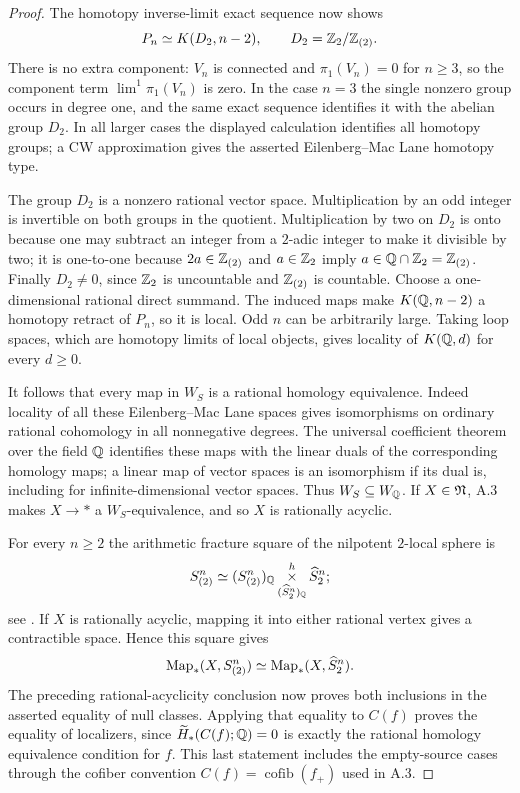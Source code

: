 \begin{proof}
The homotopy inverse-limit exact sequence now shows
\[
 P_n\simeq K(D_2,n-2),\qquad D_2=\mathbb Z_2/\mathbb Z_{(2)}.
\]
There is no extra component: $V_n$ is connected and $\pi_1(V_n)=0$ for $n\geq3$, so the component term $\lim^1\pi_1(V_n)$ is zero. In the case $n=3$ the single nonzero group occurs in degree one, and the same exact sequence identifies it with the abelian group $D_2$. In all larger cases the displayed calculation identifies all homotopy groups; a CW approximation gives the asserted Eilenberg--Mac Lane homotopy type.

The group $D_2$ is a nonzero rational vector space. Multiplication by an odd integer is invertible on both groups in the quotient. Multiplication by two on $D_2$ is onto because one may subtract an integer from a $2$-adic integer to make it divisible by two; it is one-to-one because $2a\in\mathbb Z_{(2)}$ and $a\in\mathbb Z_2$ imply $a\in\mathbb Q\cap\mathbb Z_2=\mathbb Z_{(2)}$. Finally $D_2\ne0$, since $\mathbb Z_2$ is uncountable and $\mathbb Z_{(2)}$ is countable. Choose a one-dimensional rational direct summand. The induced maps make $K(\mathbb Q,n-2)$ a homotopy retract of $P_n$, so it is local. Odd $n$ can be arbitrarily large. Taking loop spaces, which are homotopy limits of local objects, gives locality of $K(\mathbb Q,d)$ for every $d\geq0$.

It follows that every map in $W_S$ is a rational homology equivalence. Indeed locality of all these Eilenberg--Mac Lane spaces gives isomorphisms on ordinary rational cohomology in all nonnegative degrees. The universal coefficient theorem over the field $\mathbb Q$ identifies these maps with the linear duals of the corresponding homology maps; a linear map of vector spaces is an isomorphism if its dual is, including for infinite-dimensional vector spaces. Thus $W_S\subseteq W_{\mathbb Q}$. If $X\in\mathfrak N$, A.3 makes $X\to *$ a $W_S$-equivalence, and so $X$ is rationally acyclic.

For every $n\geq2$ the arithmetic fracture square of the nilpotent $2$-local sphere is
\[
 S^n_{(2)}\simeq
 (S^n_{(2)})_{\mathbb Q}\mathop{\times}\limits^h_{(\widehat S^n_2)_{\mathbb Q}}
                    \widehat S^n_2;
\]
see \cite[Theorem 13.1.4]{FGHMayPonto2012}. If $X$ is rationally acyclic, mapping it into either rational vertex gives a contractible space. Hence this square gives
\[
 \operatorname{Map}_*(X,S^n_{(2)})\simeq\operatorname{Map}_*(X,\widehat S^n_2).
\]
The preceding rational-acyclicity conclusion now proves both inclusions in the asserted equality of null classes. Applying that equality to $C(f)$ proves the equality of localizers, since $\widetilde H_*(C(f);\mathbb Q)=0$ is exactly the rational homology equivalence condition for $f$. This last statement includes the empty-source cases through the cofiber convention $C(f)=\operatorname{cofib}(f_+)$ used in A.3.
\end{proof}


